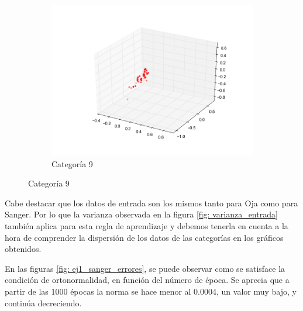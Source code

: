 \begin{figure}[H]
\begin{subfigure}[b]{0.33\textwidth}
                \includegraphics[width=\linewidth]{secciones/graficos/sanger/categoria_9.png}
                \caption{Categoría 9}
                \label{fig: ej1_sanger_categoria_9}
        \end{subfigure}
        \label{fig: ej1_sanger_categorias}
\end{figure}


\par Cabe destacar que los datos de entrada son los mismos tanto para Oja como para Sanger. Por lo que la varianza observada en la figura \ref{fig: varianza_entrada} también aplica para esta regla de aprendizaje y debemos tenerla en cuenta a la hora de comprender la dispersión de los datos de las categorías en los gráficos obtenidos.


\par En las figuras \ref{fig: ej1_sanger_errores}, se puede observar como se satisface la condición de ortonormalidad, en función del número de época. Se aprecia que a partir de las 1000 épocas la norma se hace menor al 0.0004, un valor muy bajo, y continúa decreciendo.

